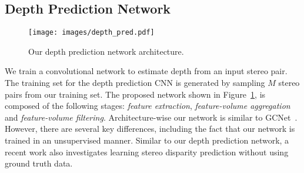 \documentclass[runningheads]{llncs}
\begin{document}
\subsection{Depth Prediction Network}
\begin{figure}[htb!]
  \centering
  \texttt{[image: images/depth\_pred.pdf]}
  \caption{Our depth prediction network architecture.}
  \label{fig:depth}
\end{figure}

We train a convolutional network to estimate depth from an input stereo pair. The training set for the depth prediction CNN is generated by sampling $M$ stereo pairs from our training set. The proposed network shown in Figure~\ref{fig:depth}, is composed of the following stages: \textit{feature extraction}, \textit{feature-volume aggregation} and \textit{feature-volume filtering}. Architecture-wise our network is similar to  GCNet~\cite{gcnet}. However, there are several key differences, including the fact that our network is trained in an unsupervised manner. Similar to our depth prediction network, a recent work \cite{zhong2017self} also investigates learning stereo disparity prediction without using ground truth data.
\newline
\end{document}
